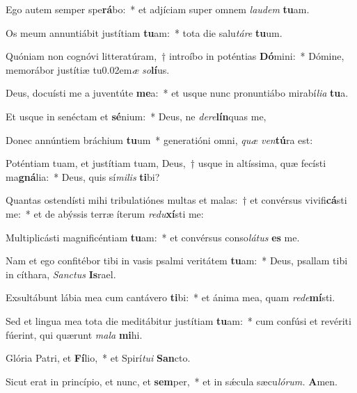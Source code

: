\item Ego autem semper spe\textbf{rá}bo:~* et adjíciam super omnem \textit{laudem} \textbf{tu}am.
\item Os meum annuntiábit justítiam \textbf{tu}am:~* tota die salu\tinyhspace\textit{táre} \textbf{tu}um.
\item Quóniam non cognóvi litteratúram,~† introíbo in poténtias \textbf{Dó}mini:~* Dómine, memorábor justítiæ tu\kern 0.02em\textit{æ} \textit{so}\textbf{lí}us.
\item Deus, docuísti me a juventúte \textbf{me}a:~* et usque nunc pronuntiábo mirabí\tinyhspace\textit{lia} \textbf{tu}a.
\item Et usque in senéctam et \textbf{sé}nium:~* Deus, ne \textit{dere}\textbf{lín}quas me,
\item Donec annúntiem bráchium \textbf{tu}um~* generatióni omni, \textit{quæ} \textit{ven}\textbf{tú}ra est:
\item Poténtiam tuam, et justítiam tuam, Deus,~† usque in altíssima, quæ fecísti ma\textbf{gná}lia:~* Deus, quis sí\textit{milis} \textbf{ti}bi?
\item Quantas ostendísti mihi tribulatiónes multas et malas:~† et convérsus vivifi\textbf{cá}sti me:~* et de abýssis terræ íterum \textit{redu}\textbf{xí}sti me:
\item Multiplicásti magnificéntiam \textbf{tu}am:~* et convérsus conso\textit{látus} \textbf{es} me.
\item Nam et ego confitébor tibi in vasis psalmi veritátem \textbf{tu}am:~* Deus, psallam tibi in cíthara, \textit{San\-ctus} \textbf{Is}rael.
\item Exsultábunt lábia mea cum cantávero \textbf{ti}bi:~* et ánima mea, quam \textit{rede}\textbf{mí}sti.
\item Sed et lingua mea tota die meditábitur ju\-stítiam \textbf{tu}am:~* cum confúsi et revériti fúerint, qui quærunt \textit{mala} \textbf{mi}hi.
\item Glória Patri, et \textbf{Fí}lio,~* et Spirí\tinyhspace\textit{tui} \textbf{San}cto.
\item Sicut erat in princípio, et nunc, et \textbf{sem}per,~* et in sǽcula sæcu\tinyhspace\textit{lórum.} \textbf{A}men.
